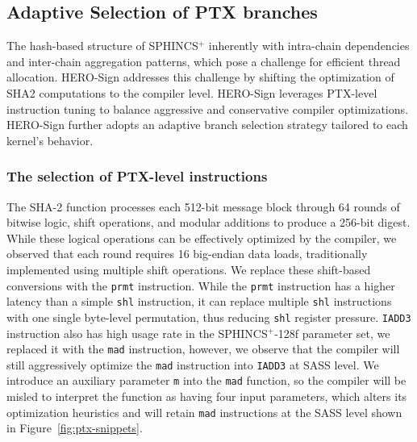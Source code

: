 \documentclass[10pt,conference]{IEEEtran}
\begin{document}
\subsection{Adaptive Selection of PTX branches}
\label{sec:PTX}

The hash-based structure of SPHINCS$^+$ inherently with intra-chain dependencies and inter-chain aggregation patterns, which pose a challenge for efficient thread allocation. HERO-Sign addresses this challenge by shifting the optimization of SHA2 computations to the compiler level. HERO-Sign leverages PTX-level instruction tuning to balance aggressive and conservative compiler optimizations. HERO-Sign further adopts an adaptive branch selection strategy tailored to each kernel’s behavior.

\subsubsection{The selection of PTX-level instructions}

The SHA-2 function processes each 512-bit message block through 64 rounds of bitwise logic, shift operations, and modular additions to produce a 256-bit digest. While these logical operations can be effectively optimized by the compiler, we observed that each round requires 16 big-endian data loads, traditionally implemented using multiple shift operations. We replace these shift-based conversions with the \texttt{prmt} instruction. While the \texttt{prmt} instruction has a higher latency than a simple \texttt{shl} instruction, it can replace multiple \texttt{shl} instructions with one single byte-level permutation, thus reducing \texttt{shl} register pressure.  \texttt{IADD3} instruction also has high usage rate in the SPHINCS$^+$-128f parameter set, we replaced it with the \texttt{mad} instruction, however, we observe that the compiler will still aggressively optimize the \texttt{mad} instruction into \texttt{IADD3} at SASS level. We introduce an auxiliary parameter \texttt{m} into the \texttt{mad} function, so the compiler will be misled to interpret the function as having four input parameters, which alters its optimization heuristics and will retain \texttt{mad} instructions at the SASS level shown in Figure~\ref {fig:ptx-snippets}.
\end{document}
